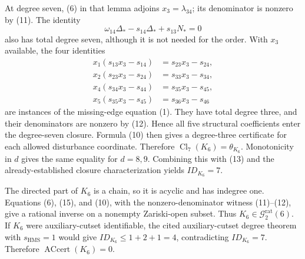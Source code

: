 At degree seven, (6) in that lemma adjoins \(x_3=\lambda_{34}\); its denominator is nonzero by (11).  The identity
\[
 \omega_{14}\Delta_{\!*}-s_{14}\Delta_{\!*}+s_{13}N_{\!*}=0 \tag{14}
\]
also has total degree seven, although it is not needed for the order.  With \(x_3\) available, the four identities
\[
\begin{aligned}
 x_1(s_{13}x_3-s_{14})&=s_{23}x_3-s_{24},\\
 x_2(s_{23}x_3-s_{24})&=s_{33}x_3-s_{34},\\
 x_4(s_{34}x_3-s_{44})&=s_{35}x_3-s_{45},\\
 x_5(s_{35}x_3-s_{45})&=s_{36}x_3-s_{46}
\end{aligned} \tag{15}
\]
are instances of the missing-edge equation (1).  They have total degree three, and their denominators are nonzero by (12).  Hence all five structural coefficients enter the degree-seven closure.  Formula (10) then gives a degree-three certificate for each allowed disturbance coordinate.  Therefore \(\operatorname{Cl}_7(K_6)=\theta_{K_6}\).  Monotonicity in \(d\) gives the same equality for \(d=8,9\).  Combining this with (13) and the already-established closure characterization yields \(ID_{K_6}=7\).

The directed part of \(K_6\) is a chain, so it is acyclic and has indegree one.  Equations (6), (15), and (10), with the nonzero-denominator witness (11)--(12), give a rational inverse on a nonempty Zariski-open subset.  Thus \(K_6\in\mathcal G_{2}^{\mathrm{rat}}(6)\).  If \(K_6\) were auxiliary-cutset identifiable, the cited auxiliary-cutset degree theorem with \(s_{\mathrm{HMS}}=1\) would give \(ID_{K_6}\leq1+2+1=4\), contradicting \(ID_{K_6}=7\).  Therefore \(\operatorname{ACcert}(K_6)=0\).

